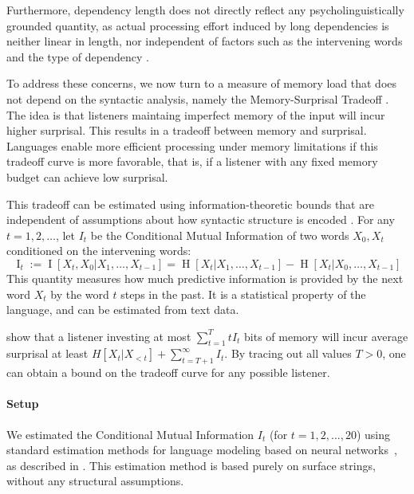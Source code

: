 \documentclass[11pt,a4paper]{article}
\begin{document}
Furthermore, dependency length does not directly reflect any psycholinguistically grounded quantity, as actual processing effort induced by long dependencies is neither linear in length, nor independent of factors such as the intervening words and the type of dependency \citep{gibson1998linguistic,lewis-activation-based-2005,demberg-data-2008}.

To address these concerns, we now turn to a measure of memory load that does not depend on the syntactic analysis, namely the Memory-Surprisal Tradeoff \citep{hahn2019memory}.
The idea is that listeners maintaing imperfect memory of the input will incur higher surprisal.
This results in a tradeoff between memory and surprisal.
Languages enable more efficient processing under memory limitations if this tradeoff curve is more favorable, that is, if a listener with any fixed memory budget can achieve low surprisal.

This tradeoff can be estimated using information-theoretic bounds that are independent of assumptions about how syntactic structure is encoded \citep{hahn2019memory}.
For any $t = 1, 2, \dots$, let $I_t$ be the Conditional Mutual Information of two words $X_0, X_t$ conditioned on the intervening words:
\begin{equation}
        \operatorname{I}_t := \operatorname{I}[X_t, X_0 | X_1, \dots, X_{t-1}] = \operatorname{H}[X_t|X_1, \dots, X_{t-1}] - \operatorname{H}[X_t|X_0, \dots, X_{t-1}] 
\end{equation}
This quantity  measures how much predictive information is provided by the next word $X_t$ by the word $t$ steps in the past.
It is a statistical property of the language, and can be estimated from text data.

\citet{hahn2019memory} show that a listener investing at most $\sum_{t=1}^T t I_t$ bits of memory will incur average surprisal at least $H[X_t| X_{<t}] + \sum_{t=T+1}^\infty I_t$.
By tracing out all values $T >0$, one can obtain a bound on the tradeoff curve for any possible listener.

\paragraph{Setup}
We estimated the Conditional Mutual Information $I_t$ (for $t=1,2,\dots,20$) using standard estimation methods for language modeling based on neural networks~\citep{hochreiter-long-1997}, as described in \citet{hahn2019memory}.
This estimation method is based purely on surface strings, without any structural assumptions.
\end{document}
